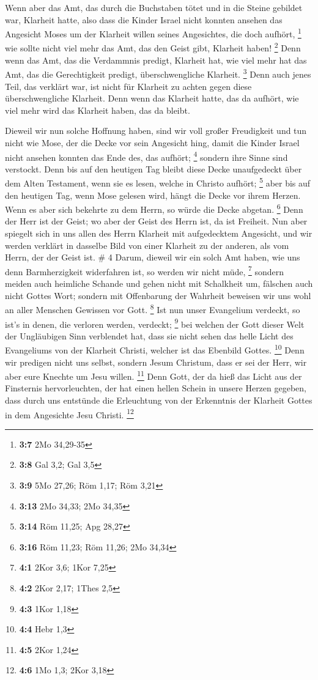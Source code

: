  Wenn aber das Amt, das durch die Buchstaben tötet und in
die Steine gebildet war, Klarheit hatte, also dass die Kinder Israel
nicht konnten ansehen das Angesicht Moses um der Klarheit willen seines
Angesichtes, die doch aufhört, \footnote{\textbf{3:7} 2Mo 34,29-35}
 wie sollte nicht viel mehr das Amt, das den Geist gibt,
Klarheit haben! \footnote{\textbf{3:8} Gal 3,2; Gal 3,5} 
Denn wenn das Amt, das die Verdammnis predigt, Klarheit hat, wie viel
mehr hat das Amt, das die Gerechtigkeit predigt, überschwengliche
Klarheit. \footnote{\textbf{3:9} 5Mo 27,26; Röm 1,17; Röm 3,21}
 Denn auch jenes Teil, das verklärt war, ist nicht für
Klarheit zu achten gegen diese überschwengliche Klarheit.
 Denn wenn das Klarheit hatte, das da aufhört, wie viel
mehr wird das Klarheit haben, das da bleibt.

 Dieweil wir nun solche Hoffnung haben, sind wir voll
großer Freudigkeit  und tun nicht wie Mose, der die Decke
vor sein Angesicht hing, damit die Kinder Israel nicht ansehen konnten
das Ende des, das aufhört; \footnote{\textbf{3:13} 2Mo 34,33; 2Mo 34,35}
 sondern ihre Sinne sind verstockt. Denn bis auf den
heutigen Tag bleibt diese Decke unaufgedeckt über dem Alten Testament,
wenn sie es lesen, welche in Christo aufhört; \footnote{\textbf{3:14}
  Röm 11,25; Apg 28,27}  aber bis auf den heutigen Tag,
wenn Mose gelesen wird, hängt die Decke vor ihrem Herzen.
 Wenn es aber sich bekehrte zu dem Herrn, so würde die
Decke abgetan. \footnote{\textbf{3:16} Röm 11,23; Röm 11,26; 2Mo 34,34}
 Denn der Herr ist der Geist; wo aber der Geist des Herrn
ist, da ist Freiheit.  Nun aber spiegelt sich in uns
allen des Herrn Klarheit mit aufgedecktem Angesicht, und wir werden
verklärt in dasselbe Bild von einer Klarheit zu der anderen, als vom
Herrn, der der Geist ist. \# 4  Darum, dieweil wir ein
solch Amt haben, wie uns denn Barmherzigkeit widerfahren ist, so werden
wir nicht müde, \footnote{\textbf{4:1} 2Kor 3,6; 1Kor 7,25}
 sondern meiden auch heimliche Schande und gehen nicht mit
Schalkheit um, fälschen auch nicht Gottes Wort; sondern mit Offenbarung
der Wahrheit beweisen wir uns wohl an aller Menschen Gewissen vor Gott.
\footnote{\textbf{4:2} 2Kor 2,17; 1Thes 2,5}  Ist nun
unser Evangelium verdeckt, so ist's in denen, die verloren werden,
verdeckt; \footnote{\textbf{4:3} 1Kor 1,18}  bei welchen
der Gott dieser Welt der Ungläubigen Sinn verblendet hat, dass sie nicht
sehen das helle Licht des Evangeliums von der Klarheit Christi, welcher
ist das Ebenbild Gottes. \footnote{\textbf{4:4} Hebr 1,3} 
Denn wir predigen nicht uns selbst, sondern Jesum Christum, dass er sei
der Herr, wir aber eure Knechte um Jesu willen. \footnote{\textbf{4:5}
  2Kor 1,24}  Denn Gott, der da hieß das Licht aus der
Finsternis hervorleuchten, der hat einen hellen Schein in unsere Herzen
gegeben, dass durch uns entstünde die Erleuchtung von der Erkenntnis der
Klarheit Gottes in dem Angesichte Jesu Christi. \footnote{\textbf{4:6}
  1Mo 1,3; 2Kor 3,18}

